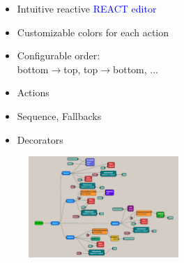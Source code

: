 \documentclass[notes,slidesec,a4]{seminar}
\begin{document}
\begin{hslide}
  


\newpage
{}
\hspace{-0.5cm}
\begin{minipage}[t]{5.7cm}
  \vspace{0.5cm}
\begin{itemize}
\item Intuitive reactive \textcolor{blue}{REACT editor}
\item Customizable colors for each action
\item Configurable order:\\ bottom$\rightarrow$top, top$\rightarrow$bottom, ...
\item Actions
\item Sequence, Fallbacks
\item Decorators
\end{itemize}
\end{minipage}
\begin{minipage}[t]{6cm}
	\begin{center}
	\begin{figure}
		\includegraphics[width=5.7cm]{figs/BtStudio0.6-4.png}
	\end{figure}
        \end{center}
\end{minipage}



\end{hslide}
\end{document}
